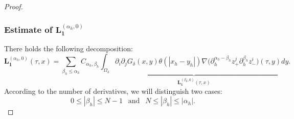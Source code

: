 \documentclass[10pt,reqno]{amsart}
\numberwithin{equation}{section}
\begin{document}
\begin{proof}
	
	
	
	\subsubsection*{\bf Estimate of $\mathbf{L}_{\mathbf{1}}^{(\alpha_h,0)}$}
	There holds the following decomposition:
	\begin{equation}\label{eqH1-decomposition-total}
		\mathbf{L}_{\mathbf{1}}^{(\alpha_h,0)}(\tau,x)
		=\sum_{\beta_h\leqslant\alpha_h}C_{\alpha_h,\beta_h}\underbrace{\int_{\Omega_\delta}\partial_i\partial_j G_\delta(x,y)\theta(|x_h-y_h|)\nabla\big(\partial_{h}^{\alpha_h-\beta_h}z_+^j\partial_{h}^{\beta_h}z_-^i\big)(\tau,y)dy}_{\mathbf{L}_{\mathbf{1}}^{(\beta_h,0)}(\tau,x)}.
	\end{equation}
	According to the number of derivatives, we will distinguish two cases: 
	\[0\leqslant|\beta_h|\leqslant N-1\ \ \text{ and }\ \ N\leqslant|\beta_h|\leqslant |\alpha_h|.\]

\end{proof}
\end{document}
